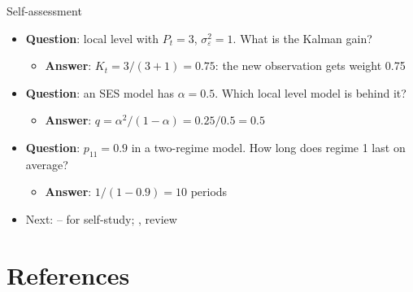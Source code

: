\begin{frame}{Self-assessment}
\itemsize{\small}
\begin{itemize}
    \item \textbf{Question}: local level with $P_t = 3$, $\sigma^2_\varepsilon = 1$. What is the Kalman gain?
    \begin{itemize}
        \item \textbf{Answer}: $K_t = 3/(3 + 1) = 0.75$: the new observation gets weight 0.75
    \end{itemize}
    \item \textbf{Question}: an SES model has $\alpha = 0.5$. Which local level model is behind it?
    \begin{itemize}
        \item \textbf{Answer}: $q = \alpha^2/(1 - \alpha) = 0.25/0.5 = 0.5$
    \end{itemize}
    \item \textbf{Question}: $p_{11} = 0.9$ in a two-regime model. How long does regime 1 last on average?
    \begin{itemize}
        \item \textbf{Answer}: $1/(1 - 0.9) = 10$ periods
    \end{itemize}
    \item Next: -- for self-study; , review
\end{itemize}
\end{frame}


\section{References}

